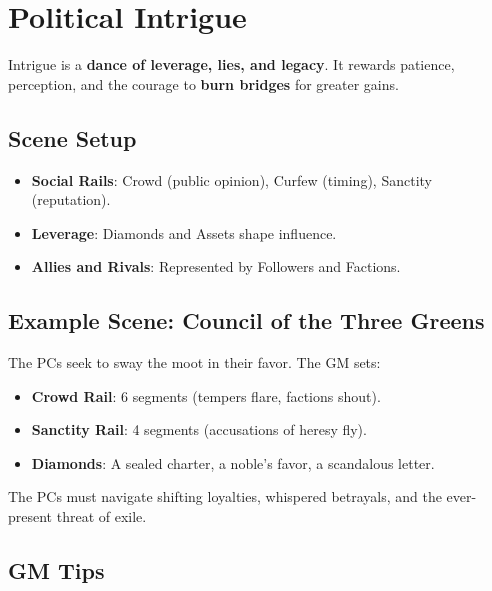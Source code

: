 \section*{Political Intrigue}

Intrigue is a \textbf{dance of leverage, lies, and legacy}. It rewards patience, perception, and the courage to \textbf{burn bridges} for greater gains.

\subsection*{Scene Setup}

\begin{itemize}
    \item \textbf{Social Rails}: Crowd (public opinion), Curfew (timing), Sanctity (reputation).
    \item \textbf{Leverage}: Diamonds and Assets shape influence.
    \item \textbf{Allies and Rivals}: Represented by Followers and Factions.
\end{itemize}

\subsection*{Example Scene: Council of the Three Greens}

The PCs seek to sway the moot in their favor. The GM sets:

\begin{itemize}
    \item \textbf{Crowd Rail}: 6 segments (tempers flare, factions shout).
    \item \textbf{Sanctity Rail}: 4 segments (accusations of heresy fly).
    \item \textbf{Diamonds}: A sealed charter, a noble's favor, a scandalous letter.
\end{itemize}

The PCs must navigate shifting loyalties, whispered betrayals, and the ever-present threat of exile.

\subsection*{GM Tips}

